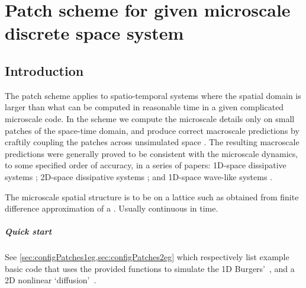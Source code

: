 \chapter{Patch scheme for given microscale discrete space system}
\label{sec:patch}
\localtableofcontents

\section{Introduction}


The patch scheme applies to spatio-temporal systems where
the spatial domain is larger than what can be computed in
reasonable time in a given complicated microscale code.  In
the scheme we compute the microscale details only on small
patches of the space-time domain, and produce correct
macroscale predictions by craftily coupling the patches
across unsimulated space \cite[e.g.]{Hyman2005, Samaey03b,
Samaey04, Roberts06d, Liu2015}.  The resulting macroscale
predictions were generally proved to be consistent with the
microscale dynamics, to some specified order of accuracy, in
a series of papers: 1D-space dissipative systems
\cite[]{Roberts06d, Bunder2013b}; 2D-space dissipative
systems \cite[]{Roberts2011a}; and 1D-space wave-like
systems \cite[]{Cao2014a}.

The microscale spatial structure is to be on a lattice such
as obtained from finite difference approximation of a \pde.
Usually continuous in time.

\paragraph{Quick start}
See \cref{sec:configPatches1eg,sec:configPatches2eg} which
respectively list example basic code that uses the provided 
functions to simulate the 1D Burgers'~\pde, and a 2D 
nonlinear `diffusion'~\pde.





\begin{devMan}



\end{devMan}

